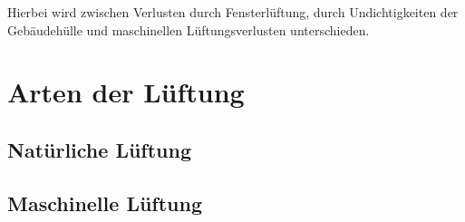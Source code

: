 Hierbei wird zwischen Verlusten durch Fensterlüftung, durch Undichtigkeiten der Gebäudehülle und maschinellen Lüftungsverlusten unterschieden.

\section{Arten der Lüftung}
\label{sec:Sektion 32}

\subsection{Natürliche Lüftung}
\label{subsec:Sektion 321}


\subsection{Maschinelle Lüftung}
\label{subsec:sektion 322}
